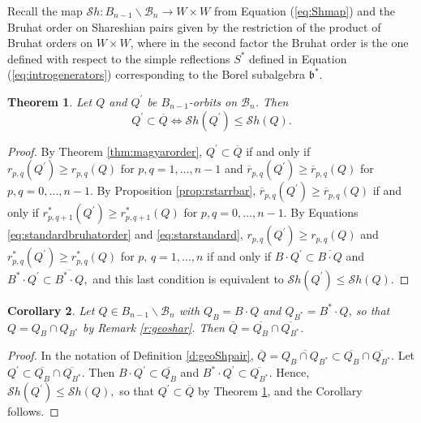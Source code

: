 \documentclass[12pt]{amsart}
\numberwithin{equation}{section}
\newtheorem{thm}{Theorem}[section]
\newtheorem{cor}[thm]{Corollary}
\newcommand{\fb}{\mbox{${\mathfrak b}$}}
\newcommand{\B}{\mathcal{B}}
\newcommand{\Borbitspace}{B_{n-1}\backslash\B_{n}}
\newcommand{\Sh}{\mathcal{S}h}
\begin{document}
Recall the map $\Sh:\Borbitspace \to W\times W$ from Equation (\ref{eq:Shmap}) and the Bruhat order on Shareshian pairs given by the restriction of the product of Bruhat orders on $W\times W$, where in the second factor the Bruhat order is the one defined with respect to the simple reflections $S^{*}$ defined in Equation (\ref{eq:introgenerators}) corresponding to the Borel subalgebra $\fb^{*}$.

\begin{thm}\label{t:sharequalbruhat}
Let $Q$ and $Q^{\prime}$ be $B_{n-1}$-orbits on $\B_n$.   Then
 $$
Q^{\prime}\subset\overline{Q}\Leftrightarrow \Sh(Q^{\prime})\leq \Sh(Q). 
$$
\end{thm}

\begin{proof}
By Theorem \ref{thm:magyarorder}, $Q^{\prime} \subset \overline{Q}$ if and only if $r_{p,q}(Q^{\prime}) \ge r_{p,q}(Q)$ for $p,q =1, \dots, n-1$ and 
$\overline{r}_{p,q}(Q^{\prime}) \ge \overline{r}_{p,q}(Q)$ for $p,q = 0, \dots, n-1$.   By Proposition \ref{prop:rstarrbar},
 $\overline{r}_{p,q}(Q^{\prime}) \ge \overline{r}_{p,q}(Q)$ if and only if
$r^*_{p,q+1}(Q^{\prime}) \ge r^*_{p,q+1}(Q)$ for $p,q =0, \dots, n-1.$  By 
Equations \eqref{eq:standardbruhatorder} and \eqref{eq:starstandard}, $r_{p,q}(Q^{\prime}) \ge r_{p,q}(Q)$ and $r^*_{p,q}(Q^{\prime}) \ge r^*_{p,q}(Q)$ for $p,\, q=1,\dots, n$ if and only if $B\cdot Q^{\prime} \subset \overline{B\cdot Q}$ and $B^* \cdot Q^{\prime} \subset \overline{B^* \cdot Q},$
and this last condition is equivalent to $\Sh(Q^{\prime})\le \Sh(Q).$
\end{proof}

\begin{cor}
Let $Q\in\Borbitspace$ with $Q_{B}=B\cdot Q$ and $Q_{B^{*}}=B^{*}\cdot Q$, so 
that $Q=Q_{B}\cap Q_{B^{*}}$ by Remark \ref{r:geoshar}.  Then 
$\overline{Q}=\overline{Q_{B}}\cap \overline{Q_{B^{*}}}$.  
\end{cor}

\begin{proof}
In the notation of Definition \ref{d:geoShpair}, $\overline{Q} = \overline{Q_B \cap Q_{B^{*}}} \subset \overline{Q_B} \cap \overline{Q_{B^{*}}}.$   Let $Q^{\prime} \subset \overline{Q_B} \cap \overline{Q_{B^{*}}}.$  Then $B\cdot Q^{\prime} \subset \overline{Q_B}$ and $B^{*}\cdot Q^{\prime} \subset \overline{Q_{B^{*}}}.$  Hence,
$\Sh(Q^{\prime}) \le \Sh(Q),$ so that $Q^{\prime} \subset \overline{Q}$ by Theorem \ref{t:sharequalbruhat}, and the Corollary follows.
\end{proof}
\end{document}
